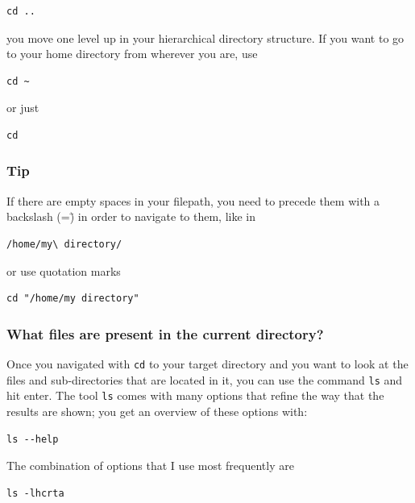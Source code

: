\documentclass[11pt]{article}
\begin{document}
\begin{verbatim}
cd ..
\end{verbatim}

 you move one level up in your hierarchical directory structure.  If
 you want to go to your home directory from wherever you are, use


\begin{verbatim}
cd ~
\end{verbatim}

 or just
 

\begin{verbatim}
cd
\end{verbatim}
\subsubsection{Tip}
\label{sec-2-1-3}

If there are empty spaces in your filepath, you need to precede them
with a backslash (=\=) in order to navigate to them, like in 


\begin{verbatim}
/home/my\ directory/
\end{verbatim}

or use quotation marks


\begin{verbatim}
cd "/home/my directory"
\end{verbatim}
\subsubsection{What files are present in the current directory?}
\label{sec-2-1-4}

 Once you navigated with \texttt{cd} to your target directory and you want to
 look at the files and sub-directories that are located in it, you can
 use the command \texttt{ls} and hit enter. The tool \texttt{ls} comes with many
 options that refine the way that the results are shown; you get an
 overview of these options with:


\begin{verbatim}
ls --help
\end{verbatim}

 The combination of options that I use most frequently are


\begin{verbatim}
ls -lhcrta
\end{verbatim}
\end{document}

